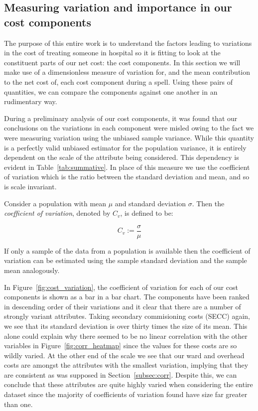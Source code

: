 \subsection{Measuring variation and importance in our cost components}

The purpose of this entire work is to understand the factors leading to
variations in the cost of treating someone in hospital so it is fitting to look
at the constituent parts of our net cost: the cost components. In this section
we will make use of a dimensionless measure of variation for, and the mean
contribution to the net cost of, each cost component during a spell. Using these
pairs of quantities, we can compare the components against one another in an
rudimentary way.

During a preliminary analysis of our cost components, it was found that our
conclusions on the variations in each component were misled owing to the fact we
were measuring variation using the unbiased sample variance. While this quantity
is a perfectly valid unbiased estimator for the population variance, it is
entirely dependent on the scale of the attribute being considered. This
dependency is evident in Table~\ref{tab:summative}. In place of this measure we
use the coefficient of variation which is the ratio between the standard
deviation and mean, and so is scale invariant.

\begin{definition}
    Consider a population with mean \(\mu\) and standard deviation \(\sigma\).
    Then the \emph{coefficient of variation}, denoted by \(C_v\), is defined to
    be:

    \[
        C_{v} := \frac{\sigma}{\mu}
    \]

    If only a sample of the data from a population is available then the
    coefficient of variation can be estimated using the sample standard
    deviation and the sample mean analogously.
\end{definition}

In Figure~\ref{fig:cost_variation}, the coefficient of variation for each of our
cost components is shown as a bar in a bar chart. The components have been
ranked in descending order of their variations and it clear that there are a
number of strongly variant attributes. Taking secondary commisioning costs
(SECC) again, we see that its standard deviation is over thirty times the size
of its mean. This alone could explain why there seemed to be no linear
correlation with the other variables in Figure~\ref{fig:corr_heatmap} since the
values for these costs are so wildly varied. At the other end of the scale we
see that our ward and overhead costs are amongst the attributes with the
smallest variation, implying that they are consistent as was supposed in
Section~\ref{subsec:corr}. Despite this, we can conclude that these attributes
are quite highly varied when considering the entire dataset since the majority
of coefficients of variation found have size far greater than one.

